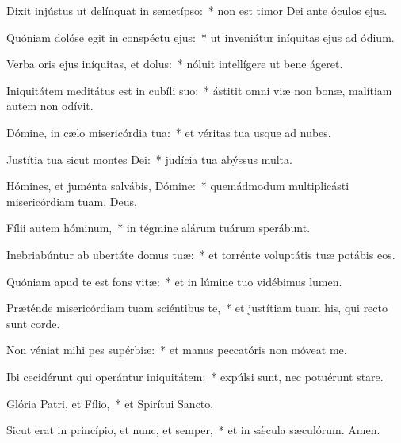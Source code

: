 \item Dixit injústus ut delínquat in semetípso:~* non est timor Dei ante óculos ejus.

\item Quóniam dolóse egit in conspéctu ejus:~* ut inveniátur iníquitas ejus ad ódium.

\item Verba oris ejus iníquitas, et dolus:~* nóluit intellígere ut bene ágeret.

\item Iniquitátem meditátus est in cubíli suo:~* ástitit omni viæ non bonæ, malítiam autem non odívit.

\item Dómine, in cælo misericórdia tua:~* et véritas tua usque ad nubes.

\item Justítia tua sicut montes Dei:~* judícia tua abýssus multa.

\item Hómines, et juménta salvábis, Dómine:~* quemádmodum multiplicásti misericórdiam tuam, Deus,

\item Fílii autem hóminum,~* in tégmine alárum tuárum sperábunt.

\item Inebriabúntur ab ubertáte domus tuæ:~* et torrénte voluptátis tuæ potábis eos.

\item Quóniam apud te est fons vitæ:~* et in lúmine tuo vidébimus lumen.

\item Præténde misericórdiam tuam sciéntibus te,~* et justítiam tuam his, qui recto sunt corde.

\item Non véniat mihi pes supérbiæ:~* et manus peccatóris non móveat me.

\item Ibi cecidérunt qui operántur iniquitátem:~* expúlsi sunt, nec potuérunt stare.

\item Glória Patri, et Fílio,~* et Spirítui Sancto.

\item Sicut erat in princípio, et nunc, et semper,~* et in sǽcula sæculórum. Amen.

